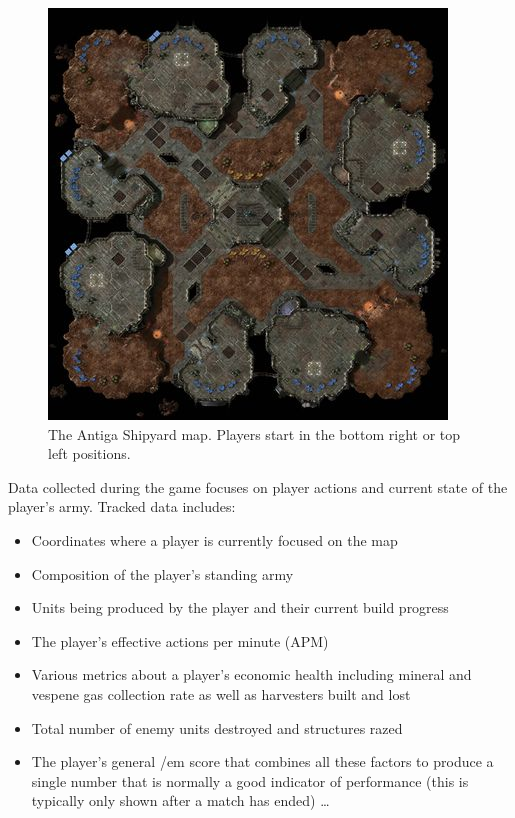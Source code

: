 \documentclass{nime-document-class}
\begin{document}
\begin{figure}[htbp]
	\centering
		\includegraphics[width=1\columnwidth]{antiga-shipyard}
	\caption{The Antiga Shipyard map. Players start in the bottom right or top left positions.}
	\label{fig:AntigaShipyardFigure}
\end{figure}

Data collected during the game focuses on player actions and current state of the player's army.
Tracked data includes:
\begin{itemize} \itemsep1pt \parskip0pt 
  \item Coordinates where a player is currently focused on the map
  \item Composition of the player's standing army
  \item Units being produced by the player and their current build progress
  \item The player's effective actions per minute (APM)
  \item Various metrics about a player's economic health including mineral and vespene gas collection rate as well as harvesters built and lost
  \item Total number of enemy units destroyed and structures razed
  \item The player's general {/em score} that combines all these factors to produce a single number that is normally a good indicator of performance (this is typically only shown after a match has ended) \ldots
\end{itemize}
\end{document}
